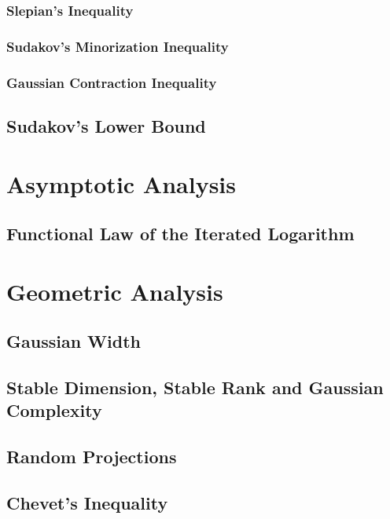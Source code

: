 \documentclass[11pt]{article}
\begin{document}
\subsubsection{Slepian's Inequality}
\subsubsection{Sudakov's Minorization Inequality}
\subsubsection{Gaussian Contraction Inequality}
\subsection{Sudakov's Lower Bound}


\section{Asymptotic Analysis}
\subsection{Functional Law of the Iterated Logarithm}


\section{Geometric Analysis}
\subsection{Gaussian Width}
\subsection{Stable Dimension, Stable Rank and Gaussian Complexity}
\subsection{Random Projections}
\subsection{Chevet's Inequality}



\newpage


\end{document}

